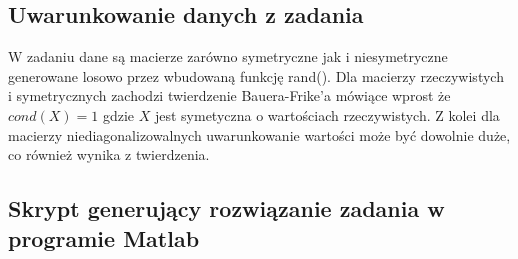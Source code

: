 \documentclass[a4paper, 11pt]{article}
\begin{document}
\subsection{Uwarunkowanie danych z zadania}
W zadaniu dane są macierze zarówno symetryczne jak i niesymetryczne generowane losowo przez wbudowaną funkcję rand(). Dla macierzy rzeczywistych i symetrycznych zachodzi twierdzenie Bauera-Frike'a mówiące wprost że $cond(X) = 1$ gdzie $X$ jest symetyczna o wartościach rzeczywistych. Z kolei dla macierzy niediagonalizowalnych uwarunkowanie wartości może być dowolnie duże, co również wynika z twierdzenia. 

\subsection{Skrypt generujący rozwiązanie zadania w programie Matlab}
\end{document}

